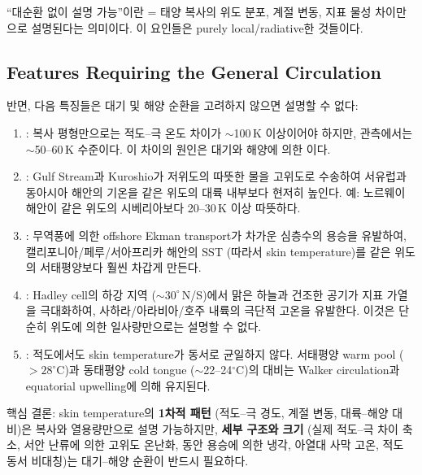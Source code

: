 \begin{hisublock}
``대순환 없이 설명 가능''이란 = 태양 복사의 위도 분포, 계절 변동, 지표 물성 차이만으로
설명된다는 의미이다.  이 요인들은 purely local/radiative한 것들이다.
\end{hisublock}

\subsection{Features Requiring the General Circulation}

\begin{remark}
반면, 다음 특징들은 대기 및 해양 순환을 고려하지 않으면 설명할 수 없다:
\begin{enumerate}
  \item {}:
        복사 평형만으로는 적도--극 온도 차이가 $\sim$100\,K 이상이어야 하지만,
        관측에서는 $\sim$50--60\,K 수준이다.
        이 차이의 원인은 대기와 해양에 의한 이다.
  \item {}:
        Gulf Stream과 Kuroshio가 저위도의 따뜻한 물을 고위도로 수송하여
        서유럽과 동아시아 해안의 기온을 같은 위도의 대륙 내부보다 현저히 높인다.
        예: 노르웨이 해안이 같은 위도의 시베리아보다 20--30\,K 이상 따뜻하다.
  \item {}:
        무역풍에 의한 offshore Ekman transport가 차가운 심층수의 용승을 유발하여,
        캘리포니아/페루/서아프리카 해안의 SST (따라서 skin temperature)를
        같은 위도의 서태평양보다 훨씬 차갑게 만든다.
  \item {}: Hadley cell의 하강 지역 ($\sim$$30^{\circ}$\,N/S)에서
        맑은 하늘과 건조한 공기가 지표 가열을 극대화하여, 사하라/아라비아/호주 내륙의
        극단적 고온을 유발한다.  이것은 단순히 위도에 의한 일사량만으로는 설명할 수 없다.
  \item {}: 적도에서도 skin temperature가 동서로 균일하지 않다.
        서태평양 warm pool ($>$$28^{\circ}$C)과 동태평양 cold tongue ($\sim$22--24$^{\circ}$C)의 대비는
        Walker circulation과 equatorial upwelling에 의해 유지된다.
\end{enumerate}
\end{remark}

\begin{hisublock}
핵심 결론: skin temperature의 \textbf{1차적 패턴} (적도--극 경도, 계절 변동, 대륙--해양 대비)은
복사와 열용량만으로 설명 가능하지만, \textbf{세부 구조와 크기}
(실제 적도--극 차이 축소, 서안 난류에 의한 고위도 온난화, 동안 용승에 의한 냉각,
아열대 사막 고온, 적도 동서 비대칭)는 대기--해양 순환이 반드시 필요하다.
\end{hisublock}

